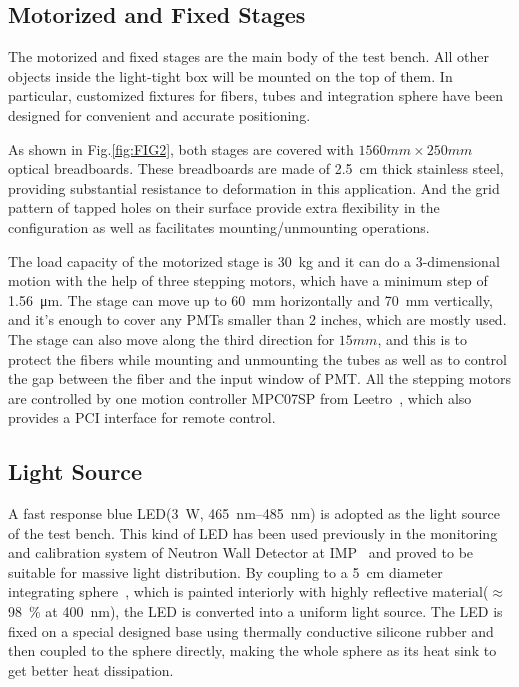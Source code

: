\documentclass[preprint, times]{elsarticle}
\begin{document}
\subsection{Motorized and Fixed Stages}
\label{sec:stages}

The motorized and fixed stages are the main body of the test bench.
All other objects inside the light-tight box will be mounted on the top of them.
In particular, customized fixtures for fibers, tubes and integration sphere have been designed for convenient and accurate positioning.

As shown in Fig.\ref{fig:FIG2}, both stages are covered with $1560mm\times250mm$ optical breadboards. 
These breadboards are made of \SI{2.5}{cm} thick stainless steel, providing substantial resistance to deformation in this application. 
And the grid pattern of tapped holes on their surface provide extra flexibility in the configuration as well as facilitates mounting/unmounting operations.

The load capacity of the motorized stage is \SI{30}{\kilo\gram} and it can do a 3-dimensional motion with the help of three stepping motors, which have a minimum step of \SI{1.56}{\micro\meter}.
The stage can move up to \SI{60}{\milli\meter} horizontally and \SI{70}{\milli\meter} vertically, and it's enough to cover any PMTs smaller than 2 inches, which are mostly used.
The stage can also move along the third direction for $15mm$, and this is to protect the fibers while mounting and unmounting the tubes as well as to control the gap between the fiber and the input window of PMT.
All the stepping motors are controlled by one motion controller MPC07SP from Leetro~\cite{leetro}, which also provides a PCI interface for remote control.

\subsection{Light Source}
\label{sec:light_source}

A fast response blue LED(\SI{3}{\watt}, \SIrange{465}{485}{\nano\meter}) is adopted as the light source of the test bench. This kind of LED has been used previously in the monitoring and calibration system of Neutron Wall Detector at IMP~\cite{yuyuhong_led} and proved to be suitable for massive light distribution. 
By coupling to a \SI{5}{\centi\meter} diameter integrating sphere~\cite{integrating_sphere}, which is painted interiorly with highly reflective material($\approx$\SI{98}{\percent} at \SI{400}{\nano\meter}), the LED is converted into a uniform light source.
The LED is fixed on a special designed base using thermally conductive silicone rubber and then coupled to the sphere directly, making the whole sphere as its heat sink to get better heat dissipation.
\end{document}
